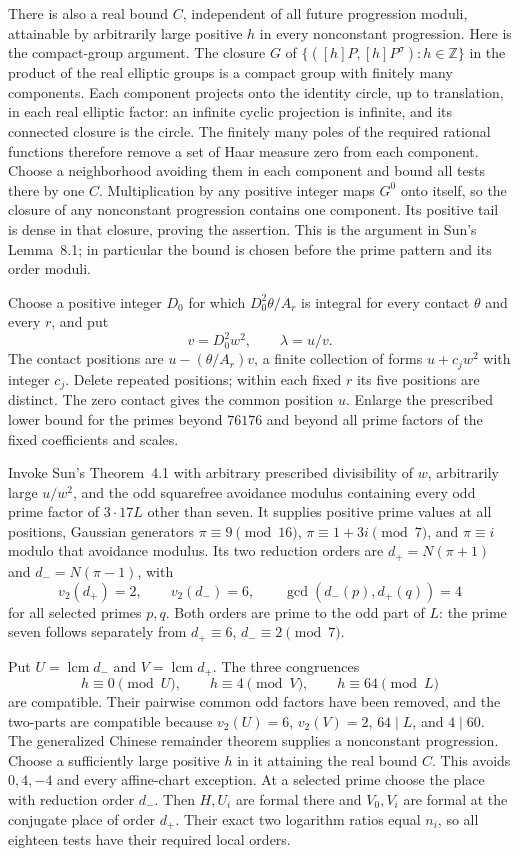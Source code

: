 There is also a real bound $C$, independent of all future progression
moduli, attainable by arbitrarily large positive $h$ in every
nonconstant progression. Here is the compact-group argument. The
closure $G$ of $\{([h]P,[h]P^\sigma):h\in\mathbb Z\}$ in the
product of the real elliptic groups is a compact group with finitely
many components. Each component projects onto the identity circle,
up to translation, in each real elliptic factor: an infinite cyclic
projection is infinite, and its connected closure is the circle.
The finitely many poles of the required rational functions therefore
remove a set of Haar measure zero from each component. Choose a
neighborhood avoiding them in each component and bound all tests
there by one $C$. Multiplication by any positive integer maps $G^0$
onto itself, so the closure of any nonconstant progression contains
one component. Its positive tail is dense in that closure, proving
the assertion. This is the argument in Sun's Lemma~8.1; in particular
the bound is chosen before the prime pattern and its order moduli.

Choose a positive integer $D_0$ for which $D_0^2\theta/A_r$ is integral
for every contact $\theta$ and every $r$, and put
\[
 v=D_0^2w^2,\qquad \lambda=u/v.
\]
The contact positions are $u-(\theta/A_r)v$, a finite collection of
forms $u+c_jw^2$ with integer $c_j$. Delete repeated positions;
within each fixed $r$ its five positions are distinct. The zero
contact gives the common position $u$. Enlarge the prescribed lower
bound for the primes beyond $76176$ and beyond all prime factors of
the fixed coefficients and scales.

Invoke Sun's Theorem~4.1 with arbitrary prescribed divisibility of $w$,
arbitrarily large $u/w^2$, and the odd squarefree avoidance modulus
containing every odd prime factor of $3\cdot17L$ other than seven.
It supplies positive prime values at all positions, Gaussian
generators $\pi\equiv9\pmod{16}$, $\pi\equiv1+3i\pmod7$, and
$\pi\equiv i$ modulo that avoidance modulus. Its two reduction orders
are $d_+=N(\pi+1)$ and $d_-=N(\pi-1)$, with
\[
 v_2(d_+)=2,\qquad v_2(d_-)=6,\qquad
 \gcd(d_-(p),d_+(q))=4
\]
for all selected primes $p,q$. Both orders are prime to the odd part
of $L$: the prime seven follows separately from
$d_+\equiv6$, $d_-\equiv2\pmod7$.

Put $U=\operatorname{lcm}d_-$ and $V=\operatorname{lcm}d_+$.
The three congruences
\[
 h\equiv0\pmod U,\qquad h\equiv4\pmod V,\qquad
 h\equiv64\pmod L
\]
are compatible. Their pairwise common odd factors have been removed,
and the two-parts are compatible because
$v_2(U)=6$, $v_2(V)=2$, $64\mid L$, and $4\mid60$.
The generalized Chinese remainder theorem supplies a nonconstant
progression. Choose a sufficiently large positive $h$ in it attaining
the real bound $C$. This avoids $0,4,-4$ and every affine-chart
exception. At a selected prime choose the place with reduction order
$d_-$. Then $H,U_i$ are formal there and $V_0,V_i$ are formal at the
conjugate place of order $d_+$. Their exact two logarithm ratios equal
$n_i$, so all eighteen tests have their required local orders.

